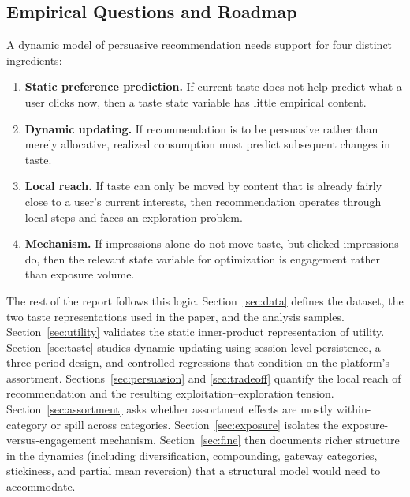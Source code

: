 \documentclass[11pt]{article}
\begin{document}
\subsection{Empirical Questions and Roadmap}

A dynamic model of persuasive recommendation needs support for four distinct ingredients:

\begin{enumerate}[leftmargin=1.5em, itemsep=0.25em, topsep=0.25em]
    \item \textbf{Static preference prediction.} If current taste does not help predict what a user clicks now, then a taste state variable has little empirical content.
    \item \textbf{Dynamic updating.} If recommendation is to be persuasive rather than merely allocative, realized consumption must predict subsequent changes in taste.
    \item \textbf{Local reach.} If taste can only be moved by content that is already fairly close to a user's current interests, then recommendation operates through local steps and faces an exploration problem.
    \item \textbf{Mechanism.} If impressions alone do not move taste, but clicked impressions do, then the relevant state variable for optimization is engagement rather than exposure volume.
\end{enumerate}

The rest of the report follows this logic. Section~\ref{sec:data} defines the dataset, the two taste representations used in the paper, and the analysis samples. Section~\ref{sec:utility} validates the static inner-product representation of utility. Section~\ref{sec:taste} studies dynamic updating using session-level persistence, a three-period design, and controlled regressions that condition on the platform's assortment. Sections~\ref{sec:persuasion} and \ref{sec:tradeoff} quantify the local reach of recommendation and the resulting exploitation--exploration tension. Section~\ref{sec:assortment} asks whether assortment effects are mostly within-category or spill across categories. Section~\ref{sec:exposure} isolates the exposure-versus-engagement mechanism. Section~\ref{sec:fine} then documents richer structure in the dynamics (including diversification, compounding, gateway categories, stickiness, and partial mean reversion) that a structural model would need to accommodate.

\end{document}
